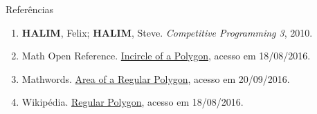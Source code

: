 \begin{frame}[fragile]{Referências}

    \begin{enumerate}
        \item \textbf{HALIM}, Felix; \textbf{HALIM}, Steve. \textit{Competitive Programming 3}, 2010.

        \item Math Open Reference. \href{http://www.mathopenref.com/polygonincircle.html}{Incircle of a Polygon}, acesso em 18/08/2016.

        \item Mathwords. \href{http://www.mathwords.com/a/area\_regular\_polygon.htm}{Area of a Regular Polygon}, acesso em 20/09/2016.

        \item Wikipédia. \href{https://en.wikipedia.org/wiki/Regular\_polygon#Circumradius}{Regular Polygon}, acesso em 18/08/2016.

    \end{enumerate}

\end{frame}
